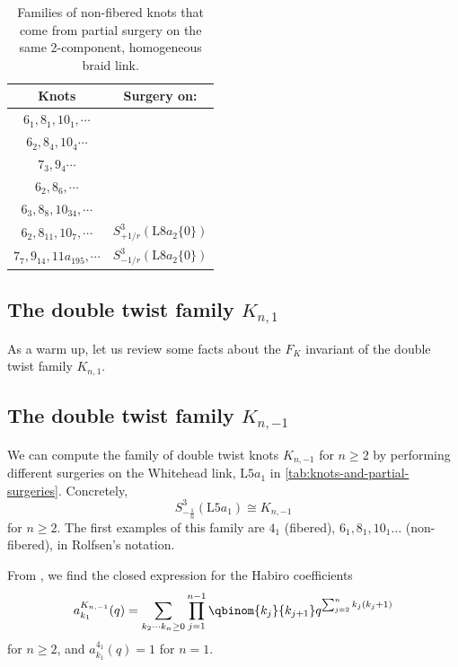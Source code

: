 \documentclass[11pt,e-only]{amsart}
\begin{document}
\begin{table}[]
    \centering
    \begin{tabular}{|c|c|}
        \hline
        Knots & Surgery on: \\
        \hline
        $6_1,8_1,10_1,\cdots$ &  \\
        \hline
        $6_2,8_4,10_4\cdots$ & \\
        $7_3,9_4\cdots$ & \\
        $6_2,8_6,\cdots$ & \\
        $6_3,8_8,10_{34},\cdots$ & \\
        \hline
        $6_2,8_{11},10_7,\cdots$ & $S^3_{+1/r}(\mathrm{L}8a_2\{0\})$\\
        $7_7,9_{14},11a_{195},\cdots$ & $S^3_{-1/r}(\mathrm{L}8a_2\{0\})$ \\
        \hline
    \end{tabular}
    \caption{Families of non-fibered knots that come from partial surgery on the same 2-component, homogeneous braid link.}
    \label{tab:placeholder}
\end{table}

\subsection{The double twist family $K_{n,1}$}

As a warm up, let us review some facts about the $F_K$ invariant of the double twist family $K_{n,1}$.

\subsection{The double twist family $K_{n,-1}$}
We can compute the family of double twist knots $K_{n,-1}$ for $n\geq 2$ by performing different surgeries on the Whitehead link, $\mathrm{L}5a_1$ in \cref{tab:knots-and-partial-surgeries}. Concretely,
\begin{equation} %
    S^3_{-\frac1n}(\mathrm{L}5a_1)\cong K_{n,-1}
\end{equation}
for $n\geq 2$. The first examples of this family are $4_1$ (fibered), $6_1, 8_1, 10_1\dots$ (non-fibered), in Rolfsen's notation. %

From \cite{RevisitingMMR}, we find the closed expression for the Habiro coefficients
\begin{equation}\label{eq:Habiro-coeffs-twist}
    a^{K_{n,-1}}_{k_1}(q)=\sum_{k_2\cdots k_n\geq 0} \prod_{j=1}^{n-1}\qbinom{k_j}{k_{j+1}} q^{\sum_{j=2}^{n} k_j(k_j+1)}
\end{equation} %
for $n\geq 2$, and $a^{4_1}_{k_1}(q) = 1$ for $n=1$. %
\end{document}
